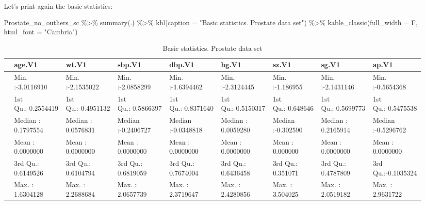 \documentclass[
]{article}
\newenvironment{Shaded}{\begin{snugshade}}{\end{snugshade}}
\newcommand{\AttributeTok}[1]{\textcolor[rgb]{0.77,0.63,0.00}{#1}}
\newcommand{\FunctionTok}[1]{\textcolor[rgb]{0.00,0.00,0.00}{#1}}
\newcommand{\NormalTok}[1]{#1}
\newcommand{\SpecialCharTok}[1]{\textcolor[rgb]{0.00,0.00,0.00}{#1}}
\newcommand{\StringTok}[1]{\textcolor[rgb]{0.31,0.60,0.02}{#1}}
\begin{document}
Let's print again the basic statistics:

\begin{Shaded}
\begin{Highlighting}[]
\NormalTok{Prostate\_no\_outliers\_sc }\SpecialCharTok{\%\textgreater{}\%} 
  \FunctionTok{summary}\NormalTok{(.) }\SpecialCharTok{\%\textgreater{}\%} 
  \FunctionTok{kbl}\NormalTok{(}\AttributeTok{caption =} \StringTok{"Basic statistics. Prostate data set"}\NormalTok{) }\SpecialCharTok{\%\textgreater{}\%}
  \FunctionTok{kable\_classic}\NormalTok{(}\AttributeTok{full\_width =}\NormalTok{ F, }\AttributeTok{html\_font =} \StringTok{"Cambria"}\NormalTok{)}
\end{Highlighting}
\end{Shaded}

\begin{table}

\caption{\label{tab:unnamed-chunk-31}Basic statistics. Prostate data set}
\centering
\begin{tabular}[t]{l|l|l|l|l|l|l|l|l}
\hline
  &        age.V1        &        wt.V1         &        sbp.V1        &        dbp.V1        &        hg.V1         &        sz.V1        &        sg.V1         &        ap.V1        \\
\hline
 & Min.   :-3.0116910 & Min.   :-2.1535022 & Min.   :-2.0858299 & Min.   :-1.6394462 & Min.   :-2.3124445 & Min.   :-1.186955 & Min.   :-2.1431146 & Min.   :-0.5654368\\
\hline
 & 1st Qu.:-0.2554419 & 1st Qu.:-0.4951132 & 1st Qu.:-0.5866397 & 1st Qu.:-0.8371640 & 1st Qu.:-0.5150317 & 1st Qu.:-0.648646 & 1st Qu.:-0.5699773 & 1st Qu.:-0.5475538\\
\hline
 & Median : 0.1797554 & Median : 0.0576831 & Median :-0.2406727 & Median :-0.0348818 & Median : 0.0059280 & Median :-0.302590 & Median : 0.2165914 & Median :-0.5296762\\
\hline
 & Mean   : 0.0000000 & Mean   : 0.0000000 & Mean   : 0.0000000 & Mean   : 0.0000000 & Mean   : 0.0000000 & Mean   : 0.000000 & Mean   : 0.0000000 & Mean   : 0.0000000\\
\hline
 & 3rd Qu.: 0.6149526 & 3rd Qu.: 0.6104794 & 3rd Qu.: 0.6819059 & 3rd Qu.: 0.7674004 & 3rd Qu.: 0.6436458 & 3rd Qu.: 0.351071 & 3rd Qu.: 0.4787809 & 3rd Qu.:-0.1035324\\
\hline
 & Max.   : 1.6304128 & Max.   : 2.2688684 & Max.   : 2.0657739 & Max.   : 2.3719647 & Max.   : 2.4280856 & Max.   : 3.504025 & Max.   : 2.0519182 & Max.   : 2.9631722\\
\hline
\end{tabular}
\end{table}
\end{document}
